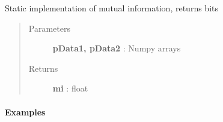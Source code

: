 \documentclass[letterpaper,10pt,english]{sphinxmanual}
\begin{document}
\begin{fulllineitems}
\label{index:halla.distance.mi}
Static implementation of mutual information, returns bits
\begin{quote}\begin{description}
\item[{Parameters}] \leavevmode
\textbf{pData1, pData2} : Numpy arrays

\item[{Returns}] \leavevmode
\textbf{mi} : float

\end{description}\end{quote}
\paragraph{Examples}


\end{fulllineitems}
\end{document}
